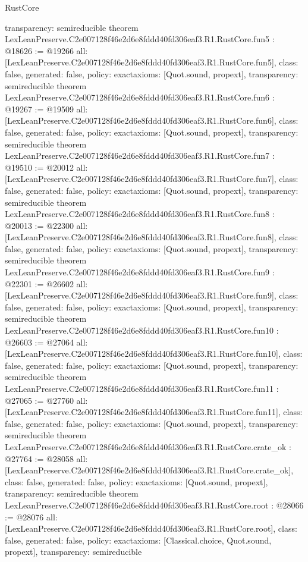 \begin{lexlean}{RustCore}
\begin{coremodule}
{  transparency: semireducible
}
theorem LexLeanPreserve.C2e007128f46e2d6e8fddd40fd306eaf3.R1.RustCore.fun5 : @18626 := @19266 {
  all: [LexLeanPreserve.C2e007128f46e2d6e8fddd40fd306eaf3.R1.RustCore.fun5],
  class: false,
  generated: false,
  policy: exact{axioms: [Quot.sound, propext]},
  transparency: semireducible
}
theorem LexLeanPreserve.C2e007128f46e2d6e8fddd40fd306eaf3.R1.RustCore.fun6 : @19267 := @19509 {
  all: [LexLeanPreserve.C2e007128f46e2d6e8fddd40fd306eaf3.R1.RustCore.fun6],
  class: false,
  generated: false,
  policy: exact{axioms: [Quot.sound, propext]},
  transparency: semireducible
}
theorem LexLeanPreserve.C2e007128f46e2d6e8fddd40fd306eaf3.R1.RustCore.fun7 : @19510 := @20012 {
  all: [LexLeanPreserve.C2e007128f46e2d6e8fddd40fd306eaf3.R1.RustCore.fun7],
  class: false,
  generated: false,
  policy: exact{axioms: [Quot.sound, propext]},
  transparency: semireducible
}
theorem LexLeanPreserve.C2e007128f46e2d6e8fddd40fd306eaf3.R1.RustCore.fun8 : @20013 := @22300 {
  all: [LexLeanPreserve.C2e007128f46e2d6e8fddd40fd306eaf3.R1.RustCore.fun8],
  class: false,
  generated: false,
  policy: exact{axioms: [Quot.sound, propext]},
  transparency: semireducible
}
theorem LexLeanPreserve.C2e007128f46e2d6e8fddd40fd306eaf3.R1.RustCore.fun9 : @22301 := @26602 {
  all: [LexLeanPreserve.C2e007128f46e2d6e8fddd40fd306eaf3.R1.RustCore.fun9],
  class: false,
  generated: false,
  policy: exact{axioms: [Quot.sound, propext]},
  transparency: semireducible
}
theorem LexLeanPreserve.C2e007128f46e2d6e8fddd40fd306eaf3.R1.RustCore.fun10 : @26603 := @27064 {
  all: [LexLeanPreserve.C2e007128f46e2d6e8fddd40fd306eaf3.R1.RustCore.fun10],
  class: false,
  generated: false,
  policy: exact{axioms: [Quot.sound, propext]},
  transparency: semireducible
}
theorem LexLeanPreserve.C2e007128f46e2d6e8fddd40fd306eaf3.R1.RustCore.fun11 : @27065 := @27760 {
  all: [LexLeanPreserve.C2e007128f46e2d6e8fddd40fd306eaf3.R1.RustCore.fun11],
  class: false,
  generated: false,
  policy: exact{axioms: [Quot.sound, propext]},
  transparency: semireducible
}
theorem LexLeanPreserve.C2e007128f46e2d6e8fddd40fd306eaf3.R1.RustCore.crate_ok : @27764 := @28058 {
  all: [LexLeanPreserve.C2e007128f46e2d6e8fddd40fd306eaf3.R1.RustCore.crate_ok],
  class: false,
  generated: false,
  policy: exact{axioms: [Quot.sound, propext]},
  transparency: semireducible
}
theorem LexLeanPreserve.C2e007128f46e2d6e8fddd40fd306eaf3.R1.RustCore.root : @28066 := @28076 {
  all: [LexLeanPreserve.C2e007128f46e2d6e8fddd40fd306eaf3.R1.RustCore.root],
  class: false,
  generated: false,
  policy: exact{axioms: [Classical.choice, Quot.sound, propext]},
  transparency: semireducible
}


\end{coremodule}
\end{lexlean}

